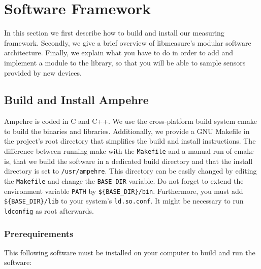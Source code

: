 %
%
%
%
%
%

\section{Software Framework}\label{sec:SoftwareArchitecture}

In this section we first describe how to build and install our measuring framework. Secondly, we give a brief overview of libmeasure's modular software architecture. Finally, we explain what you have to do in order to add and implement a module to the library, so that you will be able to sample sensors provided by new devices.

\subsection{Build and Install Ampehre}
Ampehre is coded in C and C++. We use the cross-platform build system cmake to build the binaries and libraries. Additionally, we provide a GNU Makefile in the project's root directory that simplifies the build and install instructions. The difference between running make with the \texttt{Makefile} and a manual run of cmake is, that we build the software in a dedicated build directory and that the install directory is set to \texttt{/usr/ampehre}. This directory can be easily changed by editing the \texttt{Makefile} and change the \texttt{BASE\_DIR} variable. Do not forget to extend the environment variable \texttt{PATH} by \texttt{\$\{BASE\_DIR\}/bin}. Furthermore, you must add \texttt{\$\{BASE\_DIR\}/lib} to your system's \texttt{ld.so.conf}. It might be necessary to run \texttt{ldconfig} as root afterwards.

\subsubsection{Prerequirements}
This following software must be installed on your computer to build and run the software:

